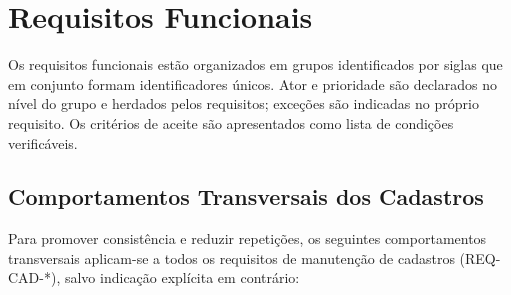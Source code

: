 \section{Requisitos Funcionais}

\setcounter{secnumdepth}{3}

Os requisitos funcionais estão organizados em grupos identificados por siglas que em conjunto formam identificadores únicos. Ator e prioridade são
declarados no nível do grupo e herdados pelos requisitos; exceções são indicadas no próprio requisito. Os critérios de aceite são apresentados
como lista de condições verificáveis.

\subsection{Comportamentos Transversais dos Cadastros}

Para promover consistência e reduzir repetições, os seguintes comportamentos transversais aplicam-se a todos os requisitos de manutenção de cadastros (REQ-CAD-*), salvo indicação explícita em contrário:

